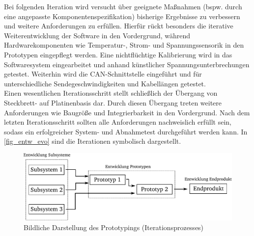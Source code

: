 Bei folgenden Iteration wird versucht über geeignete Maßnahmen (bspw. durch eine angepasste Komponentenspezifikation) bisherige Ergebnisse zu verbessern und weitere Anforderungen zu erfüllen. 
Hierfür rückt besonders die iterative Weiterentwicklung der Software in den Vordergrund, während Hardwarekomponenten wie Temperatur-, Strom- und Spannungssensorik in den Prototypen eingepflegt werden. Eine nichtflüchtige Kalibrierung wird in das Softwaresystem eingearbeitet und anhand künstlicher Spannungsunterbrechungen getestet. Weiterhin wird die CAN-Schnittstelle eingeführt und für unterschiedliche Sendegeschwindigkeiten und Kabellängen getestet.\\
Einen wesentlichen Iterationsschritt stellt schließlich der Übergang von Steckbrett- auf Platinenbasis dar. Durch diesen Übergang treten weitere Anforderungen wie Baugröße und Integrierbarkeit in den Vordergrund. Nach dem letzten Iterationsschritt sollten alle Anforderungen nachweislich erfüllt sein, sodass ein erfolgreicher System- und Abnahmetest durchgeführt werden kann. In \autoref{fig_entw_evo} sind die Iterationen symbolisch dargestellt.

\begin{figure}[H]%
\centering
\includegraphics[width=0.8\columnwidth]{./Bilder/fig_entw_evo4}%
\caption{Bildliche Darstellung des Prototypings (Iterationsprozesses)}%
\label{fig_entw_evo}%
\end{figure}
